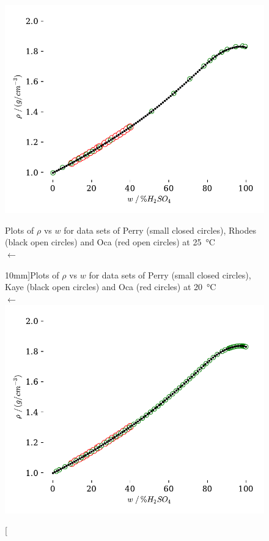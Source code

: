 \documentclass[]{tufte-handout}
\begin{document}
  

\begin{figure}
  \centering
  \caption{Plots of $\rho$ vs $w$ for data sets of Perry (small closed circles), Rhodes (black open circles) and Oca (red open circles) at \qty{25}{\degreeCelsius}\\ $\longleftarrow$ \\ \vspace{5mm} }
 \includegraphics[scale=0.65]{images/plot_B1} 
  \label{fig:plotB1}
\end{figure}
\vspace{-10mm}

\begin{figure}
  \centering
  \caption[][10mm]{Plots of $\rho$ vs $w$ for data sets of Perry (small closed circles), Kaye (black open circles) and Oca (red circles) at \qty{20}{\degreeCelsius}\\ $\longleftarrow$} 
 \includegraphics[scale=0.65]{images/plot_B2} 
  \label{fig:plotB2}
\end{figure}
\end{document}
